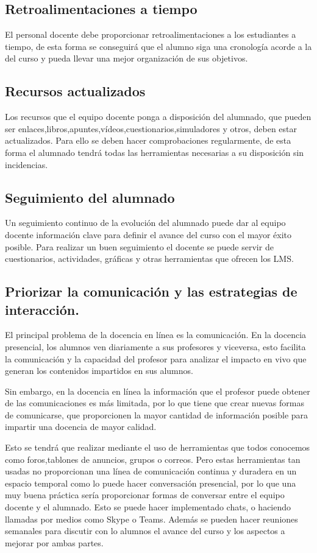 \subsection{Retroalimentaciones a tiempo}
El personal docente debe proporcionar retroalimentaciones a los estudiantes a tiempo, de esta forma se conseguirá que el alumno siga una cronología acorde a la del curso y pueda llevar una mejor organización de sus objetivos.
\subsection{Recursos actualizados}
Los recursos que el equipo docente ponga a disposición del alumnado, que pueden ser enlaces,libros,apuntes,vídeos,cuestionarios,simuladores y otros, deben estar actualizados. Para ello se deben hacer comprobaciones regularmente, de esta forma el alumnado tendrá todas las herramientas necesarias a su disposición sin incidencias. 
\subsection{Seguimiento del alumnado}
Un seguimiento continuo de la evolución del alumnado puede dar al equipo docente información clave para definir el avance del curso con el mayor éxito posible. Para realizar un buen seguimiento el docente se puede servir de cuestionarios, actividades, gráficas y otras herramientas que ofrecen los LMS.
\subsection{Priorizar la comunicación y las estrategias de interacción.}
El principal problema de la docencia en línea es la comunicación. En la docencia presencial, los alumnos ven diariamente a sus profesores y viceversa, esto facilita la comunicación y la capacidad del profesor para analizar el impacto en vivo que generan los contenidos impartidos en sus alumnos. 

Sin embargo, en la docencia en línea la información que el profesor puede obtener de las comunicaciones es más limitada, por lo que tiene que crear nuevas formas de comunicarse, que proporcionen la mayor cantidad de información posible para impartir una docencia de mayor calidad. 

Esto se tendrá que realizar mediante el uso de herramientas que todos conocemos como foros,tablones de anuncios, grupos o correos. Pero estas herramientas tan usadas no proporcionan una línea de comunicación continua y duradera en un espacio temporal como lo puede hacer conversación presencial, por lo que una muy buena práctica sería proporcionar formas de conversar entre el equipo docente y el alumnado. Esto se puede hacer implementado chats, o haciendo llamadas por medios como Skype o Teams. Además se pueden hacer reuniones semanales para discutir con lo alumnos el avance del curso y los aspectos a mejorar por ambas partes.

